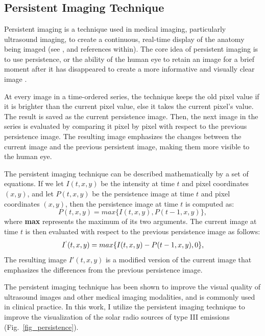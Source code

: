 \chapter{}
\label{appendix}

\section{Persistent Imaging Technique}
\label{ch3_append_a}
Persistent imaging is a technique used in medical imaging, particularly ultrasound imaging, to create a continuous, real-time display of the anatomy being imaged (see \citeauthor{pysz_2011} \citeyear{pysz_2011}, and references within). The core idea of persistent imaging is to use persistence, or the ability of the human eye to retain an image for a brief moment after it has disappeared to create a more informative and visually clear image \citep{fredkin_1995, thompson_2016}.

At every image in a time-ordered series, the technique keeps the old pixel value if it is brighter than the current pixel value, else it takes the current pixel's value. The result is saved as the current persistence image. Then, the next image in the series is evaluated by comparing it pixel by pixel with respect to the previous persistence image. The resulting image emphasizes the changes between the current image and the previous persistent image, making them more visible to the human eye.

The persistent imaging technique can be described mathematically by a set of equations. If we let $I(t,x,y)$ be the intensity at time $t$ and pixel coordinates $(x,y)$, and let $P(t,x,y)$ be the persistence image at time $t$ and pixel coordinates $(x,y)$, then the persistence image at time $t$ is computed as:
\begin{equation}
	P(t,x,y) = max\{I(t,x,y), P(t-1,x,y)\}
	,\end{equation}
where \textbf{max} represents the maximum of its two arguments. The current image at time $t$ is then evaluated with respect to the previous persistence image as follows:
\begin{equation}
	I^`(t,x,y) = max\{I(t,x,y) - P(t-1,x,y), 0\}
	,\end{equation}
The resulting image $I'(t,x,y)$ is a modified version of the current image that emphasizes the differences from the previous persistence image.

The persistent imaging technique has been shown to improve the visual quality of ultrasound images and other medical imaging modalities, and is commonly used in clinical practice. In this work, I utilize the persistent imaging technique to improve the visualization of the solar radio sources of type III emissions (Fig.~\ref{fig_persistence}).

